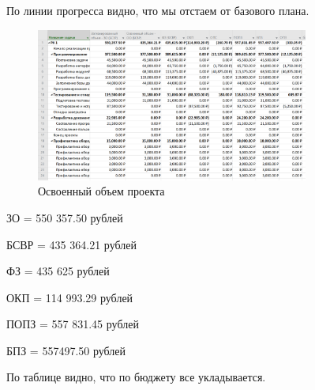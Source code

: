 По линии прогресса видно, что мы отстаем от базового плана.

\begin{figure}[H]
    \centering
    \includegraphics[width=0.8\textwidth]{img/content/task_10_4.png}
    \caption{Освоенный объем проекта}
    \label{fig:task_10_4}
\end{figure}

ЗО = 550 357.50 рублей

БСВР = 435 364.21 рублей

ФЗ = 435 625 рублей

ОКП = 114 993.29 рублей

ПОПЗ = 557 831.45 рублей

БПЗ = 557497.50 рублей

По таблице видно, что по бюджету все укладывается.
